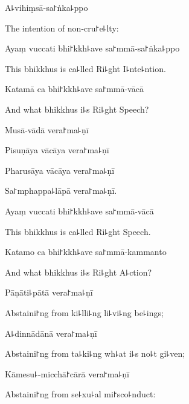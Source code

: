 A꜕vihiṃsā-sa꜓ṅka꜕ppo

\begin{english}
  The intention of non-cru꜓e꜕lty:
\end{english}

Ayaṃ vuccati bhi꜓kkh꜕ave sa꜓mmā-sa꜓ṅka꜕ppo

\begin{english}
  This bhikkhus is ca꜕lled Ri꜕ght I꜕nte꜕ntion.
\end{english}

Katamā ca bhi꜓kkh꜕ave sa꜓mmā-vācā

\begin{english}
  And what bhikkhus i꜕s Ri꜕ght Speech?
\end{english}

Musā-vādā vera꜓ma꜕ṇī


Pisuṇāya vācāya vera꜓ma꜕ṇī


Pharusāya vācāya vera꜓ma꜕ṇī


Sa꜓mphappa꜕lāpā vera꜓ma꜕ṇī.


Ayaṃ vuccati bhi꜓kkh꜕ave sa꜓mmā-vācā

\begin{english}
  This bhikkhus is ca꜕lled Ri꜕ght Speech.
\end{english}

Katamo ca bhi꜓kkh꜕ave sa꜓mmā-kammanto

\begin{english}
  And what bhikkhus i꜕s Ri꜕ght A꜕ction?
\end{english}

Pāṇāti꜕pātā vera꜓ma꜕ṇī

\begin{english}
  Abstaini꜓ng from ki꜕lli꜕ng li꜕vi꜕ng be꜕ings;
\end{english}

A꜕dinnādānā vera꜓ma꜕ṇī

\begin{english}
  Abstaini꜓ng from ta꜕ki꜕ng wh꜕at i꜕s no꜕t gi꜕ven;
\end{english}

Kāmesu꜕-micchā꜓cārā vera꜓ma꜕ṇī

\begin{english}
  Abstaini꜓ng from se꜕xu꜕al mi꜓sco꜕nduct:
\end{english}

